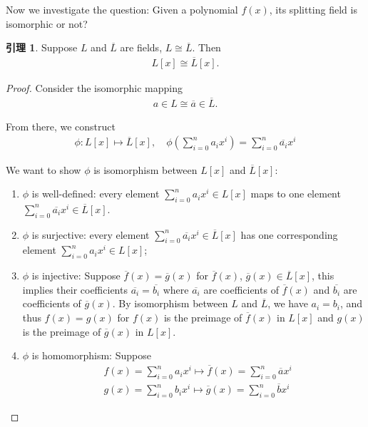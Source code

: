 \documentclass[utf8]{ctexbook}
\theoremstyle{definition}
\newtheorem{lemma}{引理}[section]
\begin{document}
Now we investigate the question: Given a polynomial $f(x)$, its splitting field is isomorphic or not?


\begin{lemma}
\label{lemma_4_4_1_poly_field_iso}
Suppose $L$ and $\overline{L}$ are fields, $ L \cong \overline{L}$. Then
\begin{align*}
L[x] \cong \overline{L} [x] .
\end{align*}
\end{lemma}

\begin{proof}
Consider the isomorphic mapping
\begin{align*}
a \in L \cong \overline{a} \in \overline{L} .
\end{align*}

From there, we construct
\begin{align*}
\phi : L[x] \mapsto \overline{L}[x], \quad \phi( \sum_{i=0} ^n a_i x^i ) = \sum_{i=0} ^n \overline{a_i} x^i
\end{align*}

We want to show $\phi$ is isomorphism between $L[x]$ and $\overline{L} [x]$:
\begin{enumerate}
\item{$\phi$ is well-defined: every element $\sum_{i=0} ^n a_i x^i \in L[x]$ maps to one element $\sum_{i=0} ^n \overline{a_i} x^i \in \overline{L}[x]$. }
\item{$\phi$ is surjective: every element $\sum_{i=0} ^n \overline{a_i} x^i \in \overline{L}[x]$ has one corresponding element $\sum_{i=0} ^n a_i x^i \in L[x]$;}
\item{$\phi$ is injective: Suppose $\overline{f} (x) = \overline{g} (x)$ for $\overline{f}(x)$, $\overline{g}(x) \in \overline{L}[x] $, this implies their coefficients $\overline{a_i} = \overline{b_i}$ where $\overline{a_i}$ are coefficients of $\overline{f}(x)$ and $\overline{b_i}$ are coefficients of $\overline{g}(x)$. By isomorphism between $L$ and $\overline{L}$, we have $a_i = b_i$, and thus $f(x) = g(x)$ for $f(x)$ is the preimage of $\overline{f}(x)$ in $L[x]$ and $g(x)$ is the preimage of $\overline{g}(x)$ in $L[x]$.
}
\item{$\phi$ is homomorphism: Suppose
\begin{align*}
& f(x) = \sum_{i=0} ^n a_i x^i  \mapsto \overline{f} (x) = \sum_{i=0} ^n \overline{a} x^i \\
& g(x) = \sum_{i=0} ^n b_i x^i  \mapsto \overline{g} (x) = \sum_{i=0} ^n \overline{b} x^i  
\end{align*}

}
\end{enumerate}
\end{proof}
\end{document}
